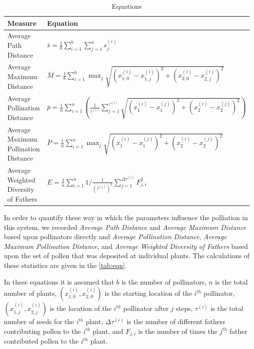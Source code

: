 \begin{table}[h]
\setlength{\extrarowheight}{1em}
{\tiny
\begin{tabular}{|l|l|}
  \hline
  Measure & Equation \\[8pt] \hline   \hline
  Average Path Distance & $\bar{s} = \frac{1}{b} \sum_{i=1}^b \sum_{j=1}^n s^{\left(i\right)}_j$ \\[8pt] \hline
  Average Maximum Distance & $ \bar{M} = \frac{1}{b} \sum_{i=1}^b \max_j \sqrt{\left(x^{\left(i\right)}_{1,0}
- x^{\left(i\right)}_{1,j}\right)^2 +
      \left(x^{\left(i\right)}_{2,0} -
x^{\left(i\right)}_{2,j}\right)^2}  $ \\[8pt] \hline
  Average Pollination Distance & $ \bar{p} = \frac{1}{n} \sum_{i=1}^{n} \left(
\frac{1}{\tau^{\left(i\right)}} \sum_{j=1}^{\tau^{\left(i\right)}}
\sqrt{\left(x^{\left(i\right)}_1 -
x^{\left(j\right)}_1\right)^2 + \left(x^{\left(i\right)}_2 -
    x^{\left(j\right)}_2\right)^2}
    \right)  $ \\[12pt]  \hline
  Average Maximum Pollination Distance & $ \bar{P} = \frac{1}{n} \sum_{i=1}^{n} \max_j \sqrt{\left(x^{\left(i\right)}_1 -
x^{\left(j\right)}_1\right)^2 + \left(x^{\left(i\right)}_2 -
    x^{\left(j\right)}_2\right)^2}$ \\[8pt]  \hline
  Average Weighted Diversity of Fathers & $ E = \frac{1}{n} \sum_{i=1}^n 1/\frac{1}{\left(\tau^{\left(i\right)}\right)^2}
  \sum_{j=1}^{\Delta\tau^{\left(i\right)}} F^2_{j,i} $ \\[8pt]
  \hline
\end{tabular}
}
\caption{Equations}
\label{tab:eqn}
\end{table}

In order to quantify these way in which the parameters influence the polliation
in this system, we recorded \emph{Average Path Distance} and \emph{Average
Maximum Distance} based upon pollinators directly and \emph{Average Pollination
Distance}, \emph{Average Maximum Pollination Distance}, and \emph{Average
Weighted Diversity of Fathers} based upon the set of pollen that was deposited
at individual plants.  The calculations of these statistics are given in the
\autoref{tab:eqn}.

In these equations it is assumed that $b$ is the number of pollinators, $n$ is
the total number of plants, $(x_{1,0}^{(i)},x_{2,0}^{(i)})$ is the starting
location of the $i^{th}$ pollinator, $(x_{1,j}^{(i)},x_{2,j}^{(i)})$ is the
location of the $i^{th}$ pollinator after $j$ steps, $\tau^{(i)}$ is the total
number of seeds for the $i^{th}$ plant, $\Delta\tau^{(i)}$ is the number of
different fathers contributing pollen to the $i^{th}$ plant, and $F_{j,i}$ is
the number of times the $j^{th}$ father contributed pollen to the $i^{th}$
plant.
